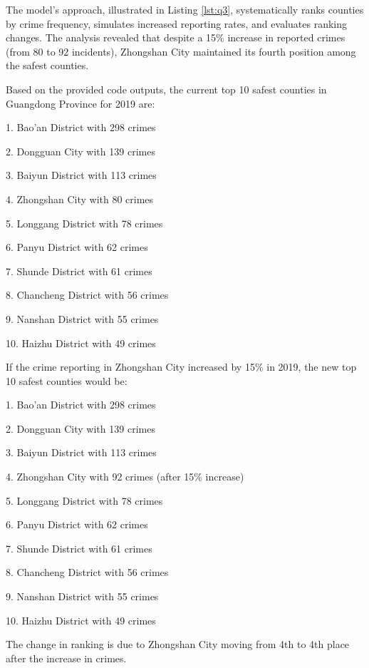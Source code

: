 The model's approach, illustrated in Listing \ref{lst:q3}, systematically ranks counties by crime frequency, simulates increased reporting rates, and evaluates ranking changes. The analysis revealed that despite a 15\% increase in reported crimes (from 80 to 92 incidents), Zhongshan City maintained its fourth position among the safest counties.



\begin{tcolorbox}[colback=white!95!black, colframe=black, title=Q3 Response, fontupper=\scriptsize, boxsep=2pt, left=3pt, right=3pt]
  Based on the provided code outputs, the current top 10 safest counties in Guangdong Province for 2019 are:

  1. Bao'an District with 298 crimes

  2. Dongguan City with 139 crimes
  
  3. Baiyun District with 113 crimes
  
  4. Zhongshan City with 80 crimes
  
  5. Longgang District with 78 crimes
  
  6. Panyu District with 62 crimes
  
  7. Shunde District with 61 crimes
  
  8. Chancheng District with 56 crimes
  
  9. Nanshan District with 55 crimes
  
  10. Haizhu District with 49 crimes

  If the crime reporting in Zhongshan City increased by 15\% in 2019, the new top 10 safest counties would be:

  1. Bao'an District with 298 crimes

  2. Dongguan City with 139 crimes

  3. Baiyun District with 113 crimes

  4. Zhongshan City with 92 crimes (after 15\% increase)

  5. Longgang District with 78 crimes

  6. Panyu District with 62 crimes

  7. Shunde District with 61 crimes

  8. Chancheng District with 56 crimes

  9. Nanshan District with 55 crimes

  10. Haizhu District with 49 crimes

  The change in ranking is due to Zhongshan City moving from 4th to 4th place after the increase in crimes.
\end{tcolorbox}


